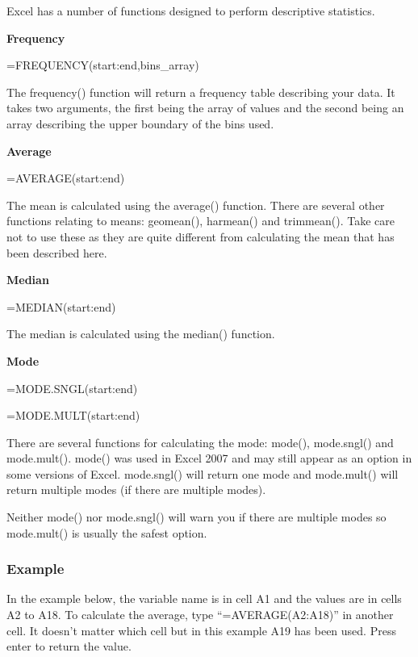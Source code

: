 \documentclass[
]{book}
\begin{document}
Excel has a number of functions designed to perform descriptive statistics.

\textbf{Frequency}

=FREQUENCY(start:end,bins\_array)

The frequency() function will return a frequency table describing your data. It takes two arguments, the first being the array of values and the second being an array describing the upper boundary of the bins used.

\textbf{Average}

=AVERAGE(start:end)

The mean is calculated using the average() function. There are several other functions relating to means: geomean(), harmean() and trimmean(). Take care not to use these as they are quite different from calculating the mean that has been described here.

\textbf{Median}

=MEDIAN(start:end)

The median is calculated using the median() function.

\textbf{Mode}

=MODE.SNGL(start:end)

=MODE.MULT(start:end)

There are several functions for calculating the mode: mode(), mode.sngl() and mode.mult().
mode() was used in Excel 2007 and may still appear as an option in some versions of Excel.
mode.sngl() will return one mode and mode.mult() will return multiple modes (if there are multiple modes).

Neither mode() nor mode.sngl() will warn you if there are multiple modes so mode.mult() is usually the safest option.

\hypertarget{example-6}{%
\subsubsection{Example}\label{example-6}}

In the example below, the variable name is in cell A1 and the values are in cells A2 to A18. To calculate the average, type ``=AVERAGE(A2:A18)'' in another cell. It doesn't matter which cell but in this example A19 has been used. Press enter to return the value.
\end{document}

